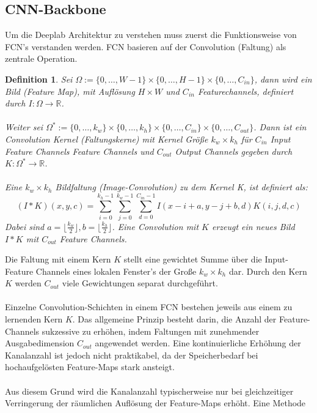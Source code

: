 \documentclass[12pt,DIV=15,BCOR=15mm,twoside,headsepline,abstract=true,listof=totoc,bibliography=totoc]{scrreprt}
\newtheorem{defi}{Definition}
\theoremstyle{remark}    %
\begin{document}
    \subsection{CNN-Backbone}
    Um die Deeplab Architektur zu verstehen muss zuerst die Funktionsweise von \ac{FCN}'s verstanden werden.  
    \ac{FCN} basieren auf der Convolution (Faltung) als zentrale Operation. 
    \begin{defi}
    Sei $\Omega := \{0, \ldots , W-1\} \times \{ 0, \ldots, H-1\} \times  \{ 0, \ldots,C_{in}\}$, dann wird ein Bild (Feature Map), mit Auflösung $H\times W$ 
    und $C_{in}$ Featurechannels, definiert durch $I: \Omega \to \mathbb{R}$.\\\\
    Weiter sei $\Omega^* := \{0, \ldots , k_w\} \times \{ 0, \ldots, k_h\} \times \{0, \ldots, C_{in} \} \times  \{0, \ldots,C_{out}\} $. Dann ist ein 
    Convolution Kernel (Faltungskerne) mit Kernel Größe $k_w  \times k_h$ für $C_{in}$ Input Feature Channels Feature Channels und $C_{out}$ Output 
    Channels gegeben durch $K: \Omega^* \to \mathbb{R}$.\\\\
    Eine $k_w\times k_h$ Bildfaltung (Image-Convolution) zu dem Kernel K, ist definiert als:  
    \[
    (I * K)(x, y, c) = \sum_{i =0}^{k_h-1}\sum_{j=0}^{k_w-1} \sum_{d = 0}^{C_{in}-1}I(x-i +a, y-j+b, d)K(i,j,d,c)
    \]
    Dabei sind $a = \lfloor \frac{k_w}{2} \rfloor, b = \lfloor \frac{k_h}{2} \rfloor$. Eine Convolution mit $K$ erzeugt ein neues Bild $I * K$ 
    mit $C_{out}$ Feature Channels.\cite{pytorch_Convolution}
    \end{defi} \noindent
    Die Faltung mit einem Kern $K$ stellt eine gewichtet Summe über die Input-Feature Channels eines lokalen Fenster's der Große $k_w \times k_h$ dar. 
    Durch den Kern $K$ werden $C_{out}$ viele Gewichtungen separat durchgeführt.\\\\
    Einzelne Convolution-Schichten in einem \ac{FCN} bestehen jeweils aus einem zu lernenden Kern $K$. Das allgemeine Prinzip besteht darin, die Anzahl der 
    Feature-Channels sukzessive zu erhöhen, indem Faltungen mit zunehmender Ausgabedimension $C_{out}$ angewendet werden. Eine kontinuierliche Erhöhung der 
    Kanalanzahl ist jedoch nicht praktikabel, da der Speicherbedarf bei hochaufgelösten Feature-Maps stark ansteigt.\\\\
    Aus diesem Grund wird die Kanalanzahl typischerweise nur bei gleichzeitiger Verringerung der räumlichen Auflösung der Feature-Maps erhöht. Eine Methode 
\end{document}
